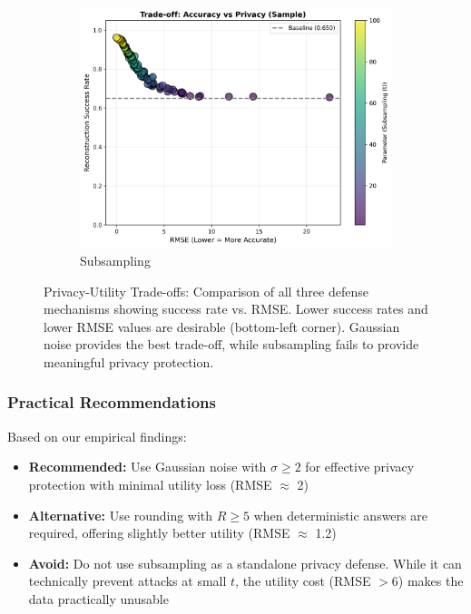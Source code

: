 \documentclass[11pt,letterpaper]{article}
\begin{document}
\begin{figure}[H]
\begin{subfigure}[b]{0.45\textwidth}
        \includegraphics[width=\textwidth]{tradeoff_sample.png}
        \caption{Subsampling}
    \end{subfigure}
    \caption{Privacy-Utility Trade-offs: Comparison of all three defense mechanisms showing success rate vs. RMSE. Lower success rates and lower RMSE values are desirable (bottom-left corner). Gaussian noise provides the best trade-off, while subsampling fails to provide meaningful privacy protection.}
    \label{fig:tradeoff_comparison}
\end{figure}

\subsubsection{Practical Recommendations}

Based on our empirical findings:

\begin{itemize}[leftmargin=*]
    \item \textbf{Recommended:} Use Gaussian noise with $\sigma \geq 2$ for effective privacy protection with minimal utility loss (RMSE $\approx$ 2)
    \item \textbf{Alternative:} Use rounding with $R \geq 5$ when deterministic answers are required, offering slightly better utility (RMSE $\approx$ 1.2)
    \item \textbf{Avoid:} Do not use subsampling as a standalone privacy defense. While it can technically prevent attacks at small $t$, the utility cost (RMSE $> 6$) makes the data practically unusable
\end{itemize}
\end{document}
